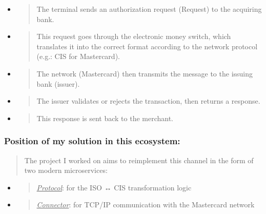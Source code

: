 \documentclass[12pt,a4paper]{report}
\begin{document}
\begin{itemize}
\item
  \begin{quote}
  The terminal sends an authorization request (Request) to the acquiring
  bank.
  \end{quote}
\item
  \begin{quote}
  This request goes through the electronic money switch, which
  translates it into the correct format according to the network
  protocol (e.g.: CIS for Mastercard).
  \end{quote}
\item
  \begin{quote}
  The network (Mastercard) then transmits the message to the issuing
  bank (issuer).
  \end{quote}
\item
  \begin{quote}
  The issuer validates or rejects the transaction, then returns a
  response.
  \end{quote}
\item
  \begin{quote}
  This response is sent back to the merchant.
  \end{quote}
\end{itemize}

\hypertarget{position-of-my-solution-in-this-ecosystem}{%
\subsubsection{\texorpdfstring{\textbf{Position of my solution in this
ecosystem:}}{Position of my solution in this ecosystem:}}\label{position-of-my-solution-in-this-ecosystem}}

\begin{quote}
The project I worked on aims to reimplement this channel in the form of
two modern microservices:
\end{quote}

\begin{itemize}
\item
  \begin{quote}
  \emph{\uline{Protocol}}: for the ISO ↔ CIS transformation logic
  \end{quote}
\item
  \begin{quote}
  \emph{\uline{Connector}}: for TCP/IP communication with the Mastercard
  network
  \end{quote}
\end{itemize}
\end{document}
